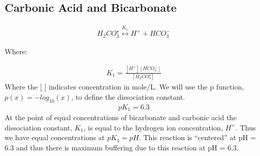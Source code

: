 \documentclass[letterpaper,10pt,english]{sphinxmanual}
\begin{document}
\subsection{Carbonic Acid and Bicarbonate}
\label{\detokenize{Rapid_Mix/RM_Derivations:carbonic-acid-and-bicarbonate}}\label{\detokenize{Rapid_Mix/RM_Derivations:heading-carbonic-acid-and-bicarbonate}}\begin{equation}\label{equation:Rapid_Mix/RM_Derivations:carbonate}
\begin{split}{H_2}CO_3^{\star} \overset {K_1} \longleftrightarrow {H^+} + HCO_3^-\end{split}
\end{equation}\begin{description}
\item[{Where:}] \leavevmode
{}

\end{description}
\begin{equation}\label{equation:Rapid_Mix/RM_Derivations:Rapid_Mix/RM_Derivations:0}
\begin{split}{K_1} = \frac{{\left[ {{H^ + }} \right]\left[ {HCO_3^ - } \right]}}{{\left[ {{H_2}CO_3^{\star} } \right]}}\end{split}
\end{equation}
Where the {[} {]} indicates concentration in mole/L. We will use the p function, \(p(x)=-log_{10}(x)\), to define the dissociation constant.
\begin{equation}\label{equation:Rapid_Mix/RM_Derivations:Rapid_Mix/RM_Derivations:1}
\begin{split}p{K_1} = 6.3\end{split}
\end{equation}
At the point of equal concentrations of bicarbonate and carbonic acid the dissociation constant, \(K_1\), is equal to the hydrogen ion concentration, \(H^ +\). Thus we have equal concentrations at \(p{K_1} = pH\). This reaction is “centered” at pH = 6.3 and thus there is maximum buffering due to this reaction at pH = 6.3.
\end{document}
